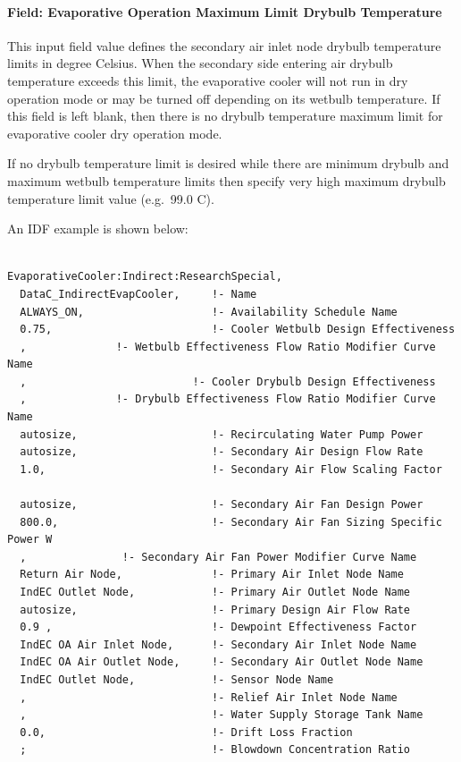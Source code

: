 \paragraph{Field: Evaporative Operation Maximum Limit Drybulb Temperature}\label{field-evaporative-operation-maximum-limit-drybulb-temperature-1}

This input field value defines the secondary air inlet node drybulb temperature limits in degree Celsius. When the secondary side entering air drybulb temperature exceeds this limit, the evaporative cooler will not run in dry operation mode or may be turned off depending on its wetbulb temperature. If this field is left blank, then there is no drybulb temperature maximum limit for evaporative cooler dry operation mode.

If no drybulb temperature limit is desired while there are minimum drybulb and maximum wetbulb temperature limits then specify very high maximum drybulb temperature limit value (e.g.~99.0 C).

An IDF example is shown below:

\begin{lstlisting}

EvaporativeCooler:Indirect:ResearchSpecial,
  DataC_IndirectEvapCooler,     !- Name
  ALWAYS_ON,                    !- Availability Schedule Name
  0.75,                         !- Cooler Wetbulb Design Effectiveness
  ,              !- Wetbulb Effectiveness Flow Ratio Modifier Curve Name
  ,                          !- Cooler Drybulb Design Effectiveness
  ,              !- Drybulb Effectiveness Flow Ratio Modifier Curve Name
  autosize,                     !- Recirculating Water Pump Power
  autosize,                     !- Secondary Air Design Flow Rate
  1.0,                          !- Secondary Air Flow Scaling Factor

  autosize,                     !- Secondary Air Fan Design Power
  800.0,                        !- Secondary Air Fan Sizing Specific Power W
  ,               !- Secondary Air Fan Power Modifier Curve Name
  Return Air Node,              !- Primary Air Inlet Node Name
  IndEC Outlet Node,            !- Primary Air Outlet Node Name
  autosize,                     !- Primary Design Air Flow Rate
  0.9 ,                         !- Dewpoint Effectiveness Factor
  IndEC OA Air Inlet Node,      !- Secondary Air Inlet Node Name
  IndEC OA Air Outlet Node,     !- Secondary Air Outlet Node Name
  IndEC Outlet Node,            !- Sensor Node Name
  ,                             !- Relief Air Inlet Node Name
  ,                             !- Water Supply Storage Tank Name
  0.0,                          !- Drift Loss Fraction
  ;                             !- Blowdown Concentration Ratio
\end{lstlisting}

